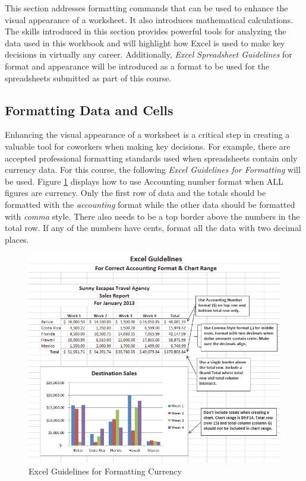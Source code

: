 This section addresses formatting commands that can be used to enhance the visual appearance of a worksheet. It also introduces mathematical calculations. The skills introduced in this section provides powerful tools for analyzing the data used in this workbook and will highlight how Excel is used to make key decisions in virtually any career. Additionally, \textit{Excel Spreadsheet Guidelines} for format and appearance will be introduced as a format to be used for the spreadsheets submitted as part of this course.

\subsection{Formatting Data and Cells}

Enhancing the visual appearance of a worksheet is a critical step in creating a valuable tool for coworkers when making key decisions. For example, there are accepted professional formatting standards used when spreadsheets contain only currency data. For this course, the following \textit{Excel Guidelines for Formatting} will be used. Figure \ref{01:fig32} displays how to use Accounting number format when ALL figures are currency. Only the first row of data and the totals should be formatted with the \textit{accounting} format while the other data should be formatted with \textit{comma} style. There also needs to be a top border above the numbers in the total row. If any of the numbers have cents, format all the data with two decimal places.

\begin{figure}[H]
	\centering
	\includegraphics[width=\maxwidth{.95\linewidth}]{gfx/ch01_fig32}
	\caption{Excel Guidelines for Formatting Currency}
	\label{01:fig32}
\end{figure}

